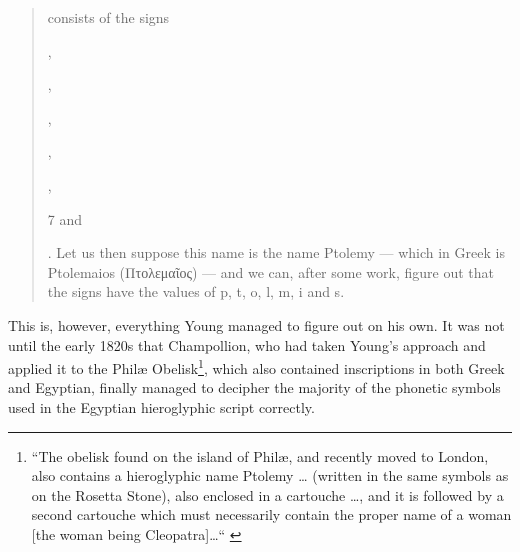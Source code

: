 \documentclass[a5paper,twoside,11pt]{report}
\begin{document}
	\begin{quote}
		\begin{hieroglyph}{\leavevmode {}\HinterSignsSpace
{}\HinterSignsSpace
{}\HinterSignsSpace
{}\HinterSignsSpace
{}}\end{hieroglyph} consists of the signs \begin{hieroglyph}{\leavevmode {}}\end{hieroglyph}, \begin{hieroglyph}{\leavevmode {}}\end{hieroglyph}, \begin{hieroglyph}{\leavevmode {}}\end{hieroglyph}, \begin{hieroglyph}{\leavevmode {}}\end{hieroglyph}, \begin{hieroglyph}{\leavevmode {}}\end{hieroglyph}, \begin{hieroglyph}{\leavevmode {}}\end{hieroglyph}7 and \begin{hieroglyph}{\leavevmode {}}\end{hieroglyph}. Let us then suppose this name is the name Ptolemy — which in Greek is Ptolemaios (Πτολεμαῖος) — and we can, after some work, figure out that the signs have the values of p, t, o, l, m, i and s.
	\end{quote}

	This is, however, everything Young managed to figure out on his own. It was not until the early 1820s that Champollion, who had taken Young’s approach and applied it to the Philæ Obelisk\footnote{“The obelisk found on the island of Philæ, and recently moved to London, also contains a hieroglyphic name Ptolemy … (written in the same symbols as on the Rosetta Stone), also enclosed in a cartouche …, and it is followed by a second cartouche which must necessarily contain the proper name of a woman [the woman being Cleopatra]…“ \parencite[p. 3]{lettre}}, which also contained inscriptions in both Greek and Egyptian, finally managed to decipher the majority of the phonetic symbols used in the Egyptian hieroglyphic script correctly.
\end{document}
